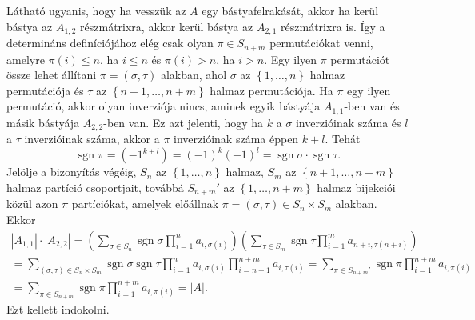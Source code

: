 \documentclass[a4paper, showtrims]{memoir}
\makeatletter
\renewenvironment{proof}[1][\proofname]
    {\par\pushQED{\qed}%
    \normalfont \topsep6\p@\@plus6\p@\relax
    \trivlist
    \item[\hskip\labelsep
        \itshape
    #1\@addpunct{:}]\ignorespaces}
    {\popQED\endtrivlist\@endpefalse}
\theoremstyle{plain}
\theoremstyle{remark}
\theoremstyle{definition}
\DeclareMathOperator{\sgn}{sgn}
\makeatother
\begin{document}
\begin{proof}[Definíció alapján]
	Látható ugyanis, hogy ha vesszük az $A$ egy bástyafelrakását, akkor ha kerül bástya az $A_{1,2}$ részmátrixra,
	akkor kerül bástya az $A_{2,1}$ részmátrixra is.
	Így a determináns definíciójához elég csak olyan $\pi\in S_{n+m}$ permutációkat venni,
	amelyre $\pi(i)\leq n$, ha $i\leq n$ és $\pi(i)>n$, ha $i>n$.
	Egy ilyen $\pi$ permutációt össze lehet állítani $\pi=\left( \sigma,\tau \right)$ alakban,
	ahol $\sigma$ az $\left\{ 1,\ldots,n \right\}$ halmaz permutációja és $\tau$ az $\left\{ n+1,\ldots,n+m \right\}$ halmaz permutációja.
	Ha $\pi$ egy ilyen permutáció,
	akkor olyan inverziója nincs,
	aminek egyik bástyája $A_{1,1}$-ben van és másik bástyája $A_{2,2}$-ben van.
	Ez azt jelenti,
	hogy ha $k$ a $\sigma$ inverzióinak száma és $l$ a $\tau$ inverzióinak száma, akkor
	a $\pi$ inverzióinak száma éppen $k+l$.
	Tehát
	\[
		\sgn\pi=\left( -1^{k+l} \right)=\left( -1 \right)^k\left( -1 \right)^l=\sgn\sigma\cdot\sgn\tau.
	\]
	Jelölje a bizonyítás végéig,
	$S_n$ az $\left\{ 1,\ldots,n \right\}$ halmaz, $S_m$ az $\left\{ n+1,\ldots,n+m \right\}$ halmaz partíció csoportjait, továbbá
	$S_{n+m}'$ az $\left\{ 1,\ldots,n+m \right\}$ halmaz bijekciói közül azon $\pi$ partíciókat,
	amelyek előállnak $\pi=\left( \sigma,\tau \right)\in S_n\times S_m$ alakban.
	Ekkor
	\begin{multline*}
		|A_{1,1}|\cdot |A_{2,2}|=
		\left(
		\sum_{\sigma\in S_n}\sgn\sigma\prod_{i=1}^na_{i,\sigma(i)}
		\right)
		\left(
		\sum_{\tau\in S_m}\sgn\tau\prod_{i=1}^ma_{n+i,\tau(n+i)}
		\right)
		\\
		=
		\sum_{(\sigma,\tau)\in S_n\times S_m}\sgn\sigma\sgn\tau\prod_{i=1}^na_{i,\sigma(i)}\prod_{i=n+1}^{n+m}a_{i,\tau(i)}
		=
		\sum_{\pi\in S_{n+m}'}\sgn\pi\prod_{i=1}^{n+m}a_{i,\pi(i)}
		\\
		=
		\sum_{\pi\in S_{n+m}}\sgn\pi\prod_{i=1}^{n+m}a_{i,\pi(i)}
		=
		|A|.
	\end{multline*}
	Ezt kellett indokolni.
\end{proof}
\end{document}
